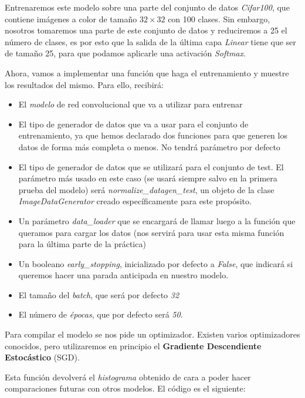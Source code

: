 \documentclass[11pt]{article}
\begin{document}
  

Entrenaremos este modelo sobre una parte del conjunto de datos
\emph{Cifar100}, que contiene imágenes a color de tamaño
\(32 \times 32\) con 100 clases. Sin embargo, nosotros tomaremos una
parte de este conjunto de datos y reduciremos a 25 el número de clases,
es por esto que la salida de la última capa \emph{Linear} tiene que ser
de tamaño 25, para que podamos aplicarle una activación \emph{Softmax}.

Ahora, vamos a implementar una función que haga el entrenamiento y
muestre los resultados del mismo. Para ello, recibirá: 

\begin{itemize}
\item El
\emph{modelo} de red convolucional que va a utilizar para entrenar
\item El
tipo de generador de datos que va a usar para el conjunto de
entrenamiento, ya que hemos declarado dos funciones para que generen los
datos de forma más completa o menos. No tendrá parámetro por defecto 
\item El tipo de generador de datos que se utilizará para el conjunto de test.
El parámetro más usado en este caso (se usará siempre salvo en la
primera prueba del modelo) será \emph{normalize\_datagen\_test}, un
objeto de la clase \emph{ImageDataGenerator} creado específicamente para
este propósito. 
\item Un parámetro \emph{data\_loader} que se encargará de
llamar luego a la función que queramos para cargar los datos (nos
servirá para usar esta misma función para la última parte de la
práctica) 
\item Un booleano \emph{early\_stopping}, inicializado por defecto
a \emph{False}, que indicará si queremos hacer una parada anticipada en
nuestro modelo. 
\item El tamaño del \emph{batch}, que será por defecto
\emph{32} 
\item El número de \emph{épocas}, que por defecto será \emph{50}.

\end{itemize}

Para compilar el modelo se nos pide un optimizador. Existen varios
optimizadores conocidos, pero utilizaremos en principio el
\textbf{Gradiente Descendiente Estocástico} (SGD).

Esta función devolverá el \emph{histograma} obtenido de cara a poder
hacer comparaciones futuras con otros modelos. El código es el
siguiente:
\end{document}
